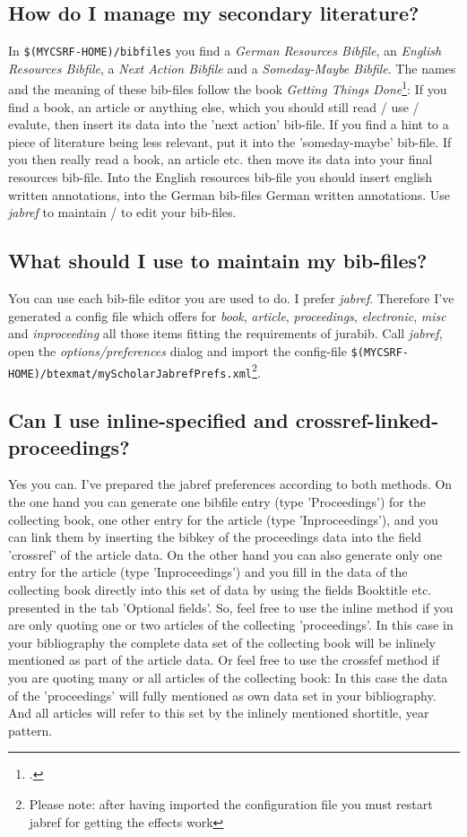 \documentclass[
  DIV=calc,
  BCOR=5mm,
  11pt,
  headings=small,
  oneside,
  abstract=true,
  toc=bib,
  ngerman,english]{scrartcl}
\begin{document}
\subsection{How do I manage my secondary literature?}
In \texttt{\$(MYCSRF-HOME)/bibfiles} you find a \textit{German Resources
Bibfile}, an \textit{English Resources Bibfile}, a \textit{Next Action Bibfile}
and a \textit{Someday-Maybe Bibfile}. The names and the meaning of these
bib-files follow the book \textit{Getting Things Done}\footcite[cf.][36 et
passim]{Allen2001a}: If you find a book, an article or anything else, which you
should still read / use / evalute, then insert its data into the 'next action'
bib-file. If you find a hint to a piece of literature being less relevant, put
it into the 'someday-maybe' bib-file. If you then really read a book, an article
etc. then move its data into your final resources bib-file. Into the English
resources bib-file you should insert english written annotations, into the
German bib-files German written annotations. Use \textit{jabref} to maintain /
to edit your bib-files.

\subsection{What should I use to maintain my bib-files?}
You can use each bib-file editor you are used to do. I prefer \textit{jabref}.
There\-fo\-re I've generated a config file which offers for \textit{book},
\textit{article}, \textit{proceedings}, \textit{elec\-tro\-nic}, \textit{misc}
and \textit{inproceeding} all those items fitting the requirements of jurabib. Call
\textit{jabref}, open the \textit{options/preferences} dialog and import the
config-file
\texttt{\$(MYCSRF-HOME)/btexmat/myScholarJabrefPrefs.xml}\footnote{Please
note: after having imported the configuration file you must restart jabref for
getting the effects work}.

\subsection{Can I use inline-specified and crossref-linked-proceedings?} 
Yes you can. I've prepared the jabref preferences according to both methods.
On the one hand you can generate one bibfile entry (type 'Proceedings') for the
collecting book, one other entry for the article (type 'Inproceedings'), and you
can link them by inserting the bibkey of the proceedings data into the field
'crossref' of the article data. On the other hand you can also generate only one
entry for the article (type 'Inproceedings') and you fill in the data of the
collecting book directly into this set of data by using the fields Booktitle
etc. presented in the tab 'Optional fields'. So, feel free to use the inline
method if you are only quoting one or two articles of the collecting
'proceedings'. In this case in your bibliography the complete data set of the
collecting book will be inlinely mentioned as part of the article data. Or feel
free to use the crossfef method if you are quoting many or all articles of the
collecting book: In this case the data of the 'proceedings' will fully mentioned
as own data set in your bibliography. And all articles will refer to this set by
the inlinely mentioned shortitle, year pattern.
\end{document}
